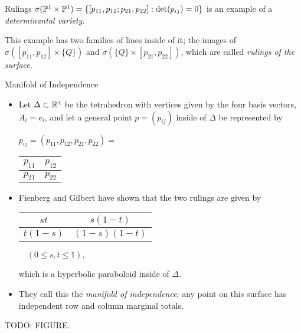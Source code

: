\begin{frame}
    
    \begin{block}{Rulings}
    $\sigma(\mathbb{P}^{1} \times \mathbb{P}^{1}) = \{ [p_{11}, p_{12}; p_{21}, p_{22}] : \det (p_{ij}) = 0 \} $ is an example of a \emph{determinantal variety}.
    
    This example has two families of lines inside of it; the images of $\sigma( [p_{11}, p_{12}] \times \{ Q \} )$ and $\sigma( \{ Q \} \times [p_{21}, p_{22}])$, which are called \emph{rulings of the surface}.
    \end{block}

\end{frame}

\begin{frame}{Manifold of Independence}

    \begin{itemize}
        \item Let $\Delta \subset \mathbb{R}^{4}$ be the tetrahedron with vertices given by the four basis vectors, $A_{i} = e_{i}$, and let a general point $p = (p_{ij})$ inside of $\Delta$ be represented by
            \begin{center}
        \begin{table}[]
        $p_{ij} = (p_{11}, p_{12}, p_{21}, p_{22}) =$ 
        \begin{tabular}{|l|l|}
        \hline
        $p_{11}$ & $p_{12}$ \\ \hline
        $p_{21}$ & $p_{22}$ \\ \hline
        \end{tabular}
        \end{table}
        \end{center}

        \item Fienberg and Gilbert have shown that the two rulings are given by
    \begin{center}
    \begin{table}[]
    \begin{tabular}{|c|c|}
    \hline
    $st$ & $s(1-t)$ \\ \hline
    $t(1-s)$ & $(1-s)(1-t)$ \\ \hline
    \end{tabular}
    $\quad (0 \leq s,t \leq 1),$
    \end{table}
    \end{center}
    
    which is a hyperbolic paraboloid inside of $\Delta$.
    
    \item They call this the \emph{manifold of independence}; any point on this surface has independent row and column marginal totals.

    \end{itemize}
    
\end{frame}

\begin{frame}
    TODO: FIGURE.
\end{frame}